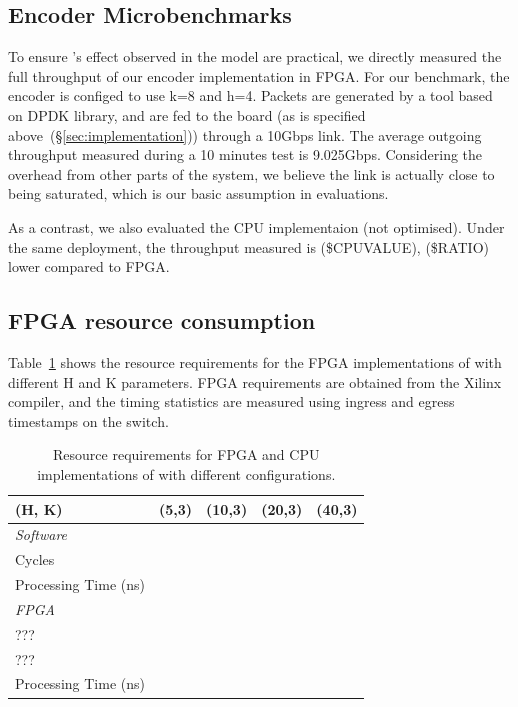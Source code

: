 \subsection{Encoder Microbenchmarks}

To ensure \OurSys's effect observed in the model are practical, we directly measured the 
full throughput of our encoder implementation in FPGA. For our benchmark, the encoder is configed to use
k=8 and h=4. Packets are generated by a tool based
on DPDK library, and are fed to the board (as is specified above~(\S\ref{sec:implementation})) through
a 10Gbps link. The average outgoing throughput measured during a 10 minutes test is 9.025Gbps.
Considering the overhead from other parts of the system, we believe the link is actually close
to being saturated, which is our basic assumption in evaluations.

As a contrast, we also evaluated the CPU implementaion (not optimised). Under the same deployment, the throughput measured is 
(\$CPUVALUE), (\$RATIO) lower compared to FPGA.
 



\subsection{FPGA resource consumption}
Table~\ref{tab:microbenchmarks} shows the resource requirements for the FPGA implementations of
\OurSys with different H and K parameters.
FPGA requirements are obtained from the Xilinx compiler, and the
timing statistics are measured using ingress and egress timestamps on
the switch.


\begin{table}
\begin{center}
\small
\begin{tabular}{ l l l l l } 
\toprule
(H, K) & (5,3) & (10,3) & (20,3) & (40,3) \\
\midrule
\emph{Software} & & & & \\
\cmidrule{1-1}
Cycles & & & & \\
Processing Time (ns) & & & & \\
\midrule
\emph{FPGA} & & & & \\
\cmidrule{1-1}
??? & & & & \\
??? & & & & \\
Processing Time (ns) & & & & \\
\bottomrule

\end{tabular}
\caption{Resource requirements for FPGA and CPU implementations of \OurSys with different configurations.}
\label{tab:microbenchmarks}
\end{center}
\end{table}


